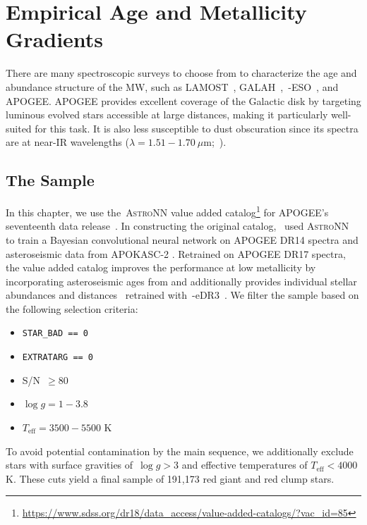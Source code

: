 
\section{Empirical Age and Metallicity Gradients}
\label{outflows:sec:empirical}
There are many spectroscopic surveys to choose from to characterize the age and
abundance structure of the MW, such as LAMOST~\citep{Luo2015},
GALAH~\citep{DeSilva2015, Martell2017},~\gaia-ESO~\citep{Gilmore2012}, and
APOGEE\space\citep{Majewski2017}.
APOGEE provides excellent coverage of the Galactic disk by targeting luminous
evolved stars accessible at large distances, making it particularly well-suited
for this task.
It is also less susceptible to dust obscuration since its spectra are at
near-IR wavelengths ($\lambda = 1.51 - 1.70~\mu$m;~\citealt{Wilson2019}).

\subsection{The Sample}
\label{outflows:sec:empirical:apogee}
In this chapter, we use the~\textsc{AstroNN} value added catalog\footnote{
	\url{https://www.sdss.org/dr18/data_access/value-added-catalogs/?vac_id=85}
} for APOGEE's seventeenth data release~\citep[DR17;][]{Abdurrouf2022}.
In constructing the original catalog,~\citet{Mackereth2019b} used
\textsc{AstroNN}~\citep{Leung2019a} to train a Bayesian convolutional neural
network on APOGEE DR14 spectra and asteroseismic data from APOKASC-2
\citep{Pinsonneault2018}.
Retrained on APOGEE DR17 spectra, the value added catalog improves the
performance at low metallicity by incorporating asteroseismic ages from
\citet{Montalban2021} and additionally provides individual stellar abundances
\citep{Leung2019a} and distances~\citep{Leung2019b} retrained
with~\gaia-eDR3~\citep{GaiaCollaboration2021}.
We filter the sample based on the following selection criteria:
\begin{itemize}

	\item \texttt{STAR\_BAD == 0}

	\item \texttt{EXTRATARG == 0}

	\item S/N~$\geq 80$

	\item $\log g = 1 - 3.8$

	\item $T_\text{eff} = 3500 - 5500$ K

\end{itemize}
To avoid potential contamination by the main sequence, we additionally exclude
stars with surface gravities of~$\log g > 3$ and effective temperatures of
$T_\text{eff} < 4000$ K.
These cuts yield a final sample of 191,173 red giant and red clump stars.

